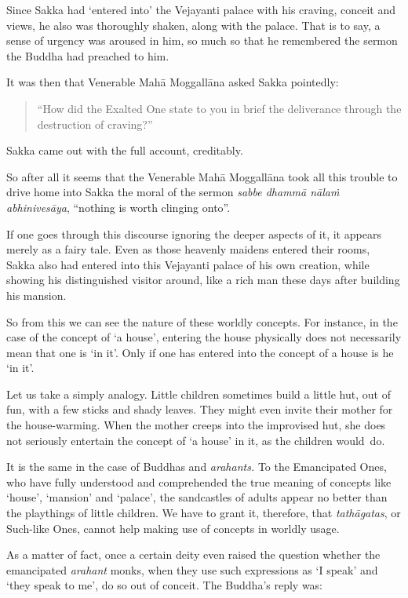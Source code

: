 Since Sakka had `entered into' the Vejayanti palace with his craving, conceit and views, he also was thoroughly shaken, along with the palace. That is to say, a sense of urgency was aroused in him, so much so that he remembered the sermon the Buddha had preached to him.

\clearpage

It was then that Venerable Mahā Moggallāna asked Sakka pointedly:

\begin{quote}
``How did the Exalted One state to you in brief the deliverance through the destruction of craving?''
\end{quote}

Sakka came out with the full account, creditably.

So after all it seems that the Venerable Mahā Moggallāna took all this trouble to drive home into Sakka the moral of the sermon \emph{sabbe dhammā nālaṁ abhinivesāya}, ``nothing is worth clinging onto''.

If one goes through this discourse ignoring the deeper aspects of it, it appears merely as a fairy tale. Even as those heavenly maidens entered their rooms, Sakka also had entered into this Vejayanti palace of his own creation, while showing his distinguished visitor around, like a rich man these days after building his mansion.

So from this we can see the nature of these worldly concepts. For instance, in the case of the concept of `a house', entering the house physically does not necessarily mean that one is `in it'. Only if one has entered into the concept of a house is he `in it'.

Let us take a simply analogy. Little children sometimes build a little hut, out of fun, with a few sticks and shady leaves. They might even invite their mother for the house-warming. When the mother creeps into the improvised hut, she does not seriously entertain the concept of `a house' in it, as the children would~do.

It is the same in the case of Buddhas and \emph{arahants.} To the Emancipated Ones, who have fully understood and comprehended the true meaning of concepts like `house', `mansion' and `palace', the sandcastles of adults appear no better than the playthings of little children. We have to grant it, therefore, that \emph{tathāgatas}, or Such-like Ones, cannot help making use of concepts in worldly usage.

As a matter of fact, once a certain deity even raised the question whether the emancipated \emph{arahant} monks, when they use such expressions as `I speak' and `they speak to me', do so out of conceit. The Buddha's reply was:


